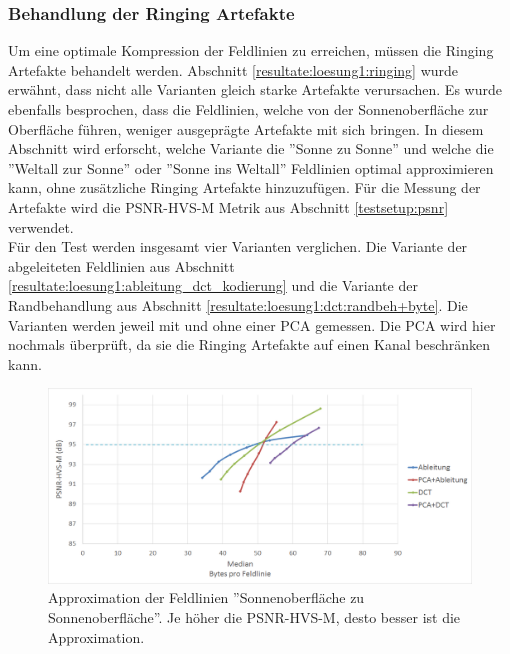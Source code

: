 \subsubsection{Behandlung der Ringing Artefakte} \label{resultate:loesung1:behandlung_ringing}
Um eine optimale Kompression der Feldlinien zu erreichen, müssen die Ringing Artefakte behandelt werden. Abschnitt \ref{resultate:loesung1:ringing} wurde erwähnt, dass nicht alle Varianten gleich starke Artefakte verursachen. Es wurde ebenfalls besprochen, dass die Feldlinien, welche von der Sonnenoberfläche zur Oberfläche führen, weniger ausgeprägte Artefakte mit sich bringen. In diesem Abschnitt wird erforscht, welche Variante die ''Sonne zu Sonne'' und welche die ''Weltall zur Sonne'' oder ''Sonne ins Weltall'' Feldlinien optimal approximieren kann, ohne zusätzliche Ringing Artefakte hinzuzufügen. Für die Messung der Artefakte wird die PSNR-HVS-M Metrik aus Abschnitt \ref{testsetup:psnr} verwendet.\\
Für den Test werden insgesamt vier Varianten verglichen. Die Variante der abgeleiteten Feldlinien aus Abschnitt \ref{resultate:loesung1:ableitung_dct_kodierung} und die Variante der Randbehandlung aus Abschnitt \ref{resultate:loesung1:dct:randbeh+byte}. Die Varianten werden jeweil mit und ohne einer PCA gemessen. Die PCA wird hier nochmals überprüft, da sie die Ringing Artefakte auf einen Kanal beschränken kann.\\
\begin{figure}[!htbp]
	\center	\includegraphics[width=1\textwidth,keepaspectratio]{./pictures/resultate/loesung1/ringing/sts.png}
	\caption{Approximation der Feldlinien ''Sonnenoberfläche zu Sonnenoberfläche''. Je höher die PSNR-HVS-M, desto besser ist die Approximation. }	\label{resultate:loesung1:dct:behandlung_ringing:sts}
\end{figure} 

